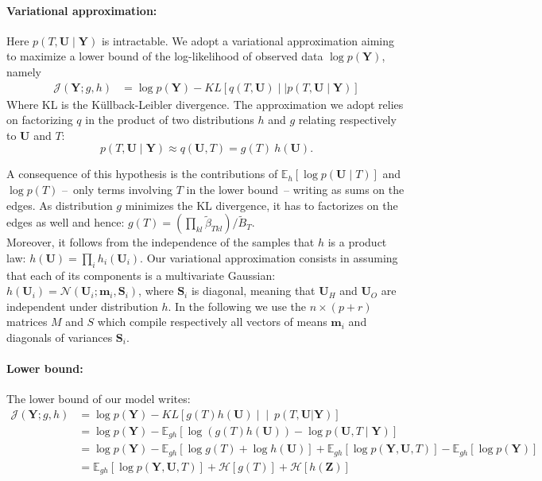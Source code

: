 \documentclass[11pt,a4paper]{article}
\newcommand{\entr}{\mathcal{H}}
\newcommand{\Ybf}{\boldsymbol{Y}}
\newcommand{\Zbf}{\boldsymbol{Z}}
\newcommand{\Ubf}{\boldsymbol{U}}
\newcommand{\Sbf}{\boldsymbol{S}}
\newcommand{\mbf}{\boldsymbol{m}}
\newcommand\Ncal{\mathcal{N}}
\newcommand{\Esp}{\mathds{E}}
\begin{document}
\paragraph{Variational approximation:}

Here $p(T,\Ubf \mid \Ybf)$ is intractable. We adopt a variational approximation aiming to maximize a lower bound of the log-likelihood of observed data $\log p(\Ybf)$, namely  
\begin{align*}
    \mathcal{J}(\Ybf; g,h)
    & = \log p(\Ybf) - KL\left[q(T,\Ubf) \mid\mid p(T,\Ubf \mid \Ybf)\right]
\end{align*}
Where KL is the Küllback-Leibler divergence. The approximation we adopt relies on factorizing $q$ in the product of two distributions $h$ and $g$ relating respectively to $\Ubf$  and $T$: 
$$p(T,\Ubf \mid\Ybf) \approx  q(\Ubf,T) = g(T)\:h(\Ubf).$$

 A consequence of this hypothesis is the contributions of   $\Esp_h[\log p(\Ubf\mid T)]$ and $\log p(T)$ --~only terms involving $T$ in the lower bound~-- writing as sums on the edges. As distribution   $g$ minimizes the KL divergence, it has to factorizes on the edges as well and hence:
$ g(T) = \left(\prod_{kl} \widetilde{\beta}_{Tkl} \right) / \widetilde{B}_T$. \\

Moreover, it follows from the independence of the samples that $h$ is a product law: $ h(\Ubf) = \prod_i h_i(\Ubf_i)$. Our variational approximation consists in assuming that each of its components is a multivariate Gaussian: $h(\Ubf_i) = \Ncal(\Ubf_i; \mbf_i, \Sbf_i)$, where $\Sbf_i$ is diagonal, meaning that $\Ubf_H$ and $\Ubf_O$ are independent under distribution $h$.  In the following we use the  $n\times (p+r)$ matrices $M$ and $S$ which compile respectively all vectors of means $\mbf_i$ and diagonals of variances $\Sbf_i$.


\paragraph{Lower bound:}
The lower bound of our model writes:
\begin{align*}
\mathcal{J}(\Ybf; g,h)&=\log p(\Ybf) - KL\left[g(T) h(\Ubf) \middle\vert\middle\vert\ p(T,\Ubf | \Ybf)\right]\\
&= \log p(\Ybf) - \Esp_{gh}[\log( g(T) h(\Ubf)) - \log p(\Ubf,T\mid \Ybf) ]\\
&= \log p(\Ybf) - \Esp_{gh}[\log g(T) + \log h(\Ubf) ] + \Esp_{gh}[\log p(\Ybf,\Ubf,T)] - \Esp_{gh}[\log p(\Ybf)]\\
&= \Esp_{gh} [\log p(\Ybf,\Ubf,T)] + \entr[g(T)] + \entr[h(\Zbf)]
\end{align*}
\end{document}
